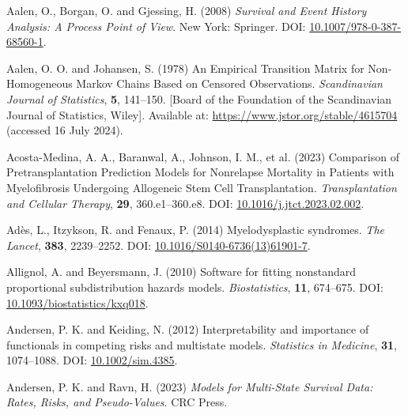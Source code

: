 \documentclass[
  letterpaper,
  DIV=11,
  numbers=noendperiod]{scrreprt}
\newlength{\cslhangindent}
\newenvironment{CSLReferences}[2] %
 {\begin{list}{}{%
  \setlength{\itemindent}{0pt}
  \setlength{\leftmargin}{0pt}
  \setlength{\parsep}{0pt}
  \ifodd #1
   \setlength{\leftmargin}{\cslhangindent}
   \setlength{\itemindent}{-1\cslhangindent}
  \fi
  \setlength{\itemsep}{#2\baselineskip}}}
 {\end{list}}
\begin{document}
\label{refs}
\begin{CSLReferences}{1}{1}
Aalen, O., Borgan, O. and Gjessing, H. (2008) \emph{Survival and Event
History Analysis: A Process Point of View}. New York: Springer. DOI:
\href{https://doi.org/10.1007/978-0-387-68560-1}{10.1007/978-0-387-68560-1}.

Aalen, O. O. and Johansen, S. (1978) An {Empirical Transition Matrix}
for {Non-Homogeneous Markov Chains Based} on {Censored Observations}.
\emph{Scandinavian Journal of Statistics}, \textbf{5}, 141--150.
{[}Board of the Foundation of the Scandinavian Journal of Statistics,
Wiley{]}. Available at: \url{https://www.jstor.org/stable/4615704}
(accessed 16 July 2024).

Acosta-Medina, A. A., Baranwal, A., Johnson, I. M., et al. (2023)
Comparison of {Pretransplantation Prediction Models} for {Nonrelapse
Mortality} in {Patients} with {Myelofibrosis Undergoing Allogeneic Stem
Cell Transplantation}. \emph{Transplantation and Cellular Therapy},
\textbf{29}, 360.e1--360.e8. DOI:
\href{https://doi.org/10.1016/j.jtct.2023.02.002}{10.1016/j.jtct.2023.02.002}.

Adès, L., Itzykson, R. and Fenaux, P. (2014) Myelodysplastic syndromes.
\emph{The Lancet}, \textbf{383}, 2239--2252. DOI:
\href{https://doi.org/10.1016/S0140-6736(13)61901-7}{10.1016/S0140-6736(13)61901-7}.

Allignol, A. and Beyersmann, J. (2010) Software for fitting nonstandard
proportional subdistribution hazards models. \emph{Biostatistics},
\textbf{11}, 674--675. DOI:
\href{https://doi.org/10.1093/biostatistics/kxq018}{10.1093/biostatistics/kxq018}.

Andersen, P. K. and Keiding, N. (2012) Interpretability and importance
of functionals in competing risks and multistate models.
\emph{Statistics in Medicine}, \textbf{31}, 1074--1088. DOI:
\href{https://doi.org/10.1002/sim.4385}{10.1002/sim.4385}.

Andersen, P. K. and Ravn, H. (2023) \emph{Models for {Multi-State
Survival Data}: {Rates}, {Risks}, and {Pseudo-Values}}. CRC Press.


\end{CSLReferences}
\end{document}
